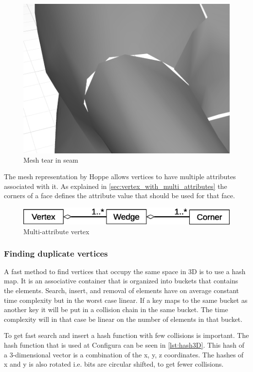 \begin{figure}[h]
    \centering
    \includegraphics[width=.5\textwidth]{figures/mesh_tear.png}
    \caption{Mesh tear in seam}
    \label{fig:mesh_tear}
\end{figure}

The mesh representation by Hoppe \cite{hoppe1998efficient} allows vertices to have multiple attributes associated with it. As explained in \cref{sec:vertex_with_multi_attributes} the corners of a face defines the attribute value that should be used for that face.

\begin{figure}[h]
    \centering
    \includegraphics[width=.5\textwidth]{figures/vertex_wedge_corner.eps}
    \caption{Multi-attribute vertex}
    \label{fig:vertex_wedge_corner}
\end{figure}

\subsubsection{Finding duplicate vertices}
A fast method to find vertices that occupy the same space in 3D is to use a hash map. It is an associative container that is organized into buckets that contains the elements. Search, insert, and removal of elements have on average constant time complexity but in the worst case linear. If a key maps to the same bucket as another key it will be put in a collision chain in the same bucket. The time complexity will in that case be linear on the number of elements in that bucket.

To get fast search and insert a hash function with few collisions is important. The hash function that is used at Configura can be seen in \cref{lst:hash3D}. This hash of a 3-dimensional vector is a combination of the x, y, z coordinates. The hashes of x and y is also rotated i.e. bits are circular shifted, to get fewer collisions. 

